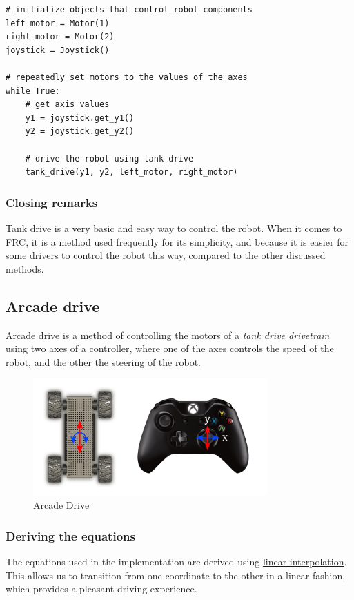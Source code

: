 \documentclass[12pt,twoside]{article}
\begin{document}
\begin{verbatim}
# initialize objects that control robot components
left_motor = Motor(1)
right_motor = Motor(2)
joystick = Joystick()

# repeatedly set motors to the values of the axes
while True:
    # get axis values
    y1 = joystick.get_y1()
    y2 = joystick.get_y2()

    # drive the robot using tank drive
    tank_drive(y1, y2, left_motor, right_motor)
\end{verbatim}



\subsubsection{Closing remarks}
Tank drive is a very basic and easy way to control the robot. When it comes to FRC, it is a method used frequently for its simplicity, and because it is easier for some drivers to control the robot this way, compared to the other discussed methods.




\subsection{Arcade drive}
Arcade drive is a method of controlling the motors of a \textit{tank drive drivetrain} using two axes of a controller, where one of the axes controls the speed of the robot, and the other the steering of the robot.

\begin{figure}[H]
\centering
\includegraphics[width=0.8\textwidth]{../assets/images/drivetrain-control/arcade-drive.png}
\caption{Arcade Drive}
\end{figure}


\subsubsection{Deriving the equations}
The equations used in the implementation are derived using \href{https://en.wikipedia.org/wiki/Linear_interpolation}{linear interpolation}. This allows us to transition from one coordinate to the other in a linear fashion, which provides a pleasant driving experience.
\end{document}
